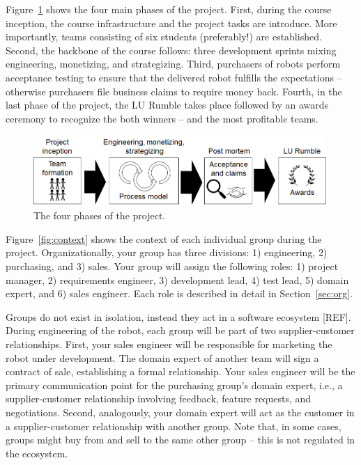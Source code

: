 \documentclass{scrreprt}
\begin{document}
Figure~\ref{fig:overview} shows the four main phases of the project. First, during the course inception, the course infrastructure and the project tasks are introduce. More importantly, teams consisting of six students (preferably!) are established. Second, the backbone of the course follows: three development sprints mixing engineering, monetizing, and strategizing. Third, purchasers of robots perform acceptance testing to ensure that the delivered robot fulfills the expectations -- otherwise purchasers file business claims to require money back. Fourth, in the last phase of the project, the LU Rumble takes place followed by an awards ceremony to recognize the both winners -- and the most profitable teams.

\begin{figure}
\centering
\includegraphics[width=0.99\textwidth]{figures/projectOverview.png}
\caption{The four phases of the project.}
\label{fig:overview}
\end{figure}

Figure~\ref{fig:context} shows the context of each individual group during the project. Organizationally, your group has three divisions: 1) engineering, 2) purchasing, and 3) sales. Your group will assign the following roles: 1) project manager, 2) requirements engineer, 3) development lead, 4) test lead, 5) domain expert, and 6) sales engineer. Each role is described in detail in Section~\ref{sec:org}.

Groups do not exist in isolation, instead they act in a software ecosystem [REF]. During engineering of the robot, each group will be part of two supplier-customer relationships. First, your sales engineer will be responsible for marketing the robot under development. The domain expert of another team will sign a contract of sale, establishing a formal relationship. Your sales engineer will be the primary communication point for the purchasing group's domain expert, i.e., a supplier-customer relationship involving feedback, feature requests, and negotiations. Second, analogously, your domain expert will act as the customer in a supplier-customer relationship with another group. Note that, in some cases, groups might buy from and sell to the same other group -- this is not regulated in the ecosystem.
\end{document}
